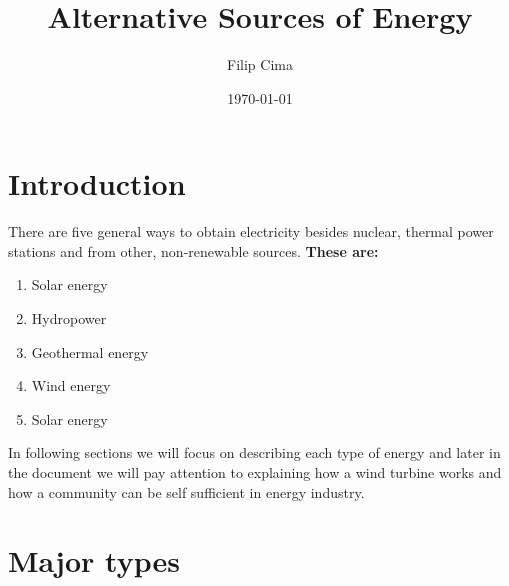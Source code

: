 \documentclass[11pt, titlepage]{article}
\title{Alternative Sources of Energy}
\author{Filip Cima}
\affil{Vysoká Škola Báňská - Technická Univerzita Ostrava}
\date{\today}
\begin{document}
\maketitle

\newpage

\tableofcontents

\newpage

\section{Introduction}

	There are five general ways to obtain electricity besides nuclear, thermal power stations and from other, non-renewable sources.
	\newline
	\textbf{These are:}
	\begin{enumerate}
		\item{Solar energy}
		\item{Hydropower}
		\item{Geothermal energy}
		\item{Wind energy}
		\item{Solar energy}
	\end{enumerate}

	In following sections we will focus on describing each type of energy and later in the document we will pay attention to explaining how a wind turbine works and how a community can be self sufficient in energy industry.
	\pagebreak
\section{Major types}
\end{document}
